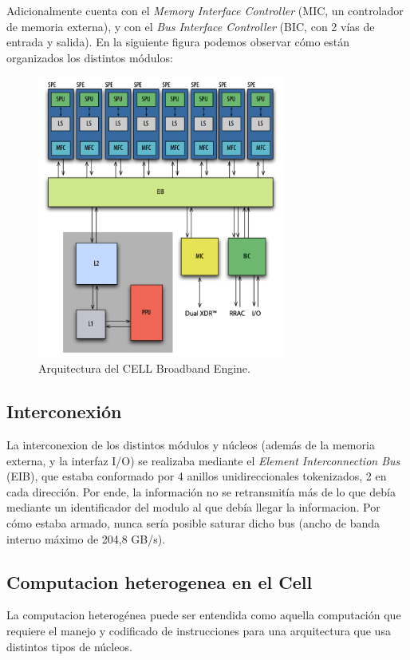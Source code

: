\documentclass[10pt,compsoc]{IEEEtran}
\begin{document}
	Adicionalmente cuenta con el \textit{Memory Interface Controller} (MIC, un controlador de memoria externa), y con el \textit{Bus Interface Controller} (BIC, con 2 vías de entrada y salida). En la siguiente figura podemos observar cómo están organizados los distintos módulos:
	
	\begin{figure}[H]
		\centering
		\includegraphics[width=3.2in]{imgs/arquitecturacell.png}
		\caption{Arquitectura del CELL Broadband Engine.}
		\label{fig3}
	\end{figure}
	
	\subsection{Interconexión} 
	\noindent La interconexion de los distintos módulos y núcleos (además de la memoria externa, y la interfaz I/O) se realizaba mediante el \textit{Element Interconnection Bus} (EIB), que estaba conformado por 4 anillos unidireccionales tokenizados, 2 en cada dirección. Por ende, la información no se retransmitía más de lo que debía mediante un identificador del modulo al que debía llegar la informacion. 
	Por cómo estaba armado, nunca sería posible saturar dicho bus (ancho de banda interno máximo de 204,8 GB/s).
	

	
	\subsection{Computacion heterogenea en el Cell}%
	\noindent La computacion heterogénea puede ser entendida como aquella computación que requiere el manejo y codificado de instrucciones para una arquitectura que usa distintos tipos de núcleos.\newline
	
\end{document}
